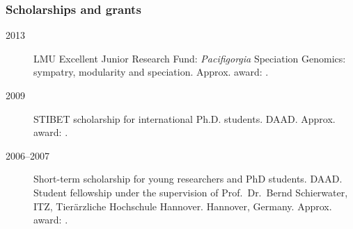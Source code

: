 \documentclass[letter,10pt]{article}
\begin{document}
\subsubsection*{Scholarships and grants}
\begin{description}
\item[2013] LMU Excellent Junior Research Fund: \emph{Pacifigorgia} Speciation Genomics: sympatry, modularity and speciation. Approx. award: .


\item[2009]  STIBET scholarship for international Ph.D. students. DAAD. Approx. award: . 


\item[2006--2007] Short-term scholarship for young researchers and PhD students. DAAD. Student fellowship under the supervision of Prof.~Dr.~Bernd Schierwater, ITZ, Tier\"arzliche Hochschule Hannover. Hannover, Germany. Approx. award: .

\end{description}
\end{document}
